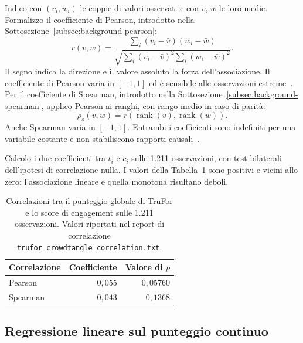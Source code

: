 Indico con $(v_i,w_i)$ le coppie di valori osservati e con $\bar v$, $\bar w$ le loro medie. Formalizzo il coefficiente di Pearson, introdotto nella Sottosezione~\ref{subsec:background-pearson}:
\begin{equation}
    r(v,w)=\frac{\sum_i(v_i-\bar v)(w_i-\bar w)}
    {\sqrt{\sum_i(v_i-\bar v)^2\sum_i(w_i-\bar w)^2}}.
    \label{eq:materiali-pearson}
\end{equation}
Il segno indica la direzione e il valore assoluto la forza dell'associazione. Il coefficiente di Pearson varia in $[-1,1]$ ed è sensibile alle osservazioni estreme~\cite{10.1098/rspl.1895.0041}. Per il coefficiente di Spearman, introdotto nella Sottosezione~\ref{subsec:background-spearman}, applico Pearson ai ranghi, con rango medio in caso di parità:
\begin{equation}
    \rho_s(v,w)=r\!\left(\operatorname{rank}(v),\operatorname{rank}(w)\right).
    \label{eq:materiali-spearman}
\end{equation}
Anche Spearman varia in $[-1,1]$. Entrambi i coefficienti sono indefiniti per una variabile costante e non stabiliscono rapporti causali~\cite{ca468a70-0be4-389a-b0b9-5dd1ff52b33f}.

Calcolo i due coefficienti tra $t_i$ e $c_i$ sulle 1.211 osservazioni, con test bilaterali dell'ipotesi di correlazione nulla. I valori della Tabella~\ref{tab:risultati-trufor-correlazioni} sono positivi e vicini allo zero: l'associazione lineare e quella monotona risultano deboli.

\begin{table}[htbp]
    \centering
    \small
    \caption{Correlazioni tra il punteggio globale di TruFor e lo score di engagement sulle 1.211 osservazioni. Valori riportati nel report di correlazione \texttt{trufor\_crowdtangle\_correlation.txt}.}
    \label{tab:risultati-trufor-correlazioni}
    \begin{tabular}{@{}lrr@{}}
        \toprule
        Correlazione & Coefficiente & Valore di $p$ \\
        \midrule
        Pearson & $0{,}055$ & $0{,}05760$ \\
        Spearman & $0{,}043$ & $0{,}1368$ \\
        \bottomrule
    \end{tabular}
\end{table}

\newpage
\subsection{Regressione lineare sul punteggio continuo}
\label{subsec:associazione-trufor-ols}

